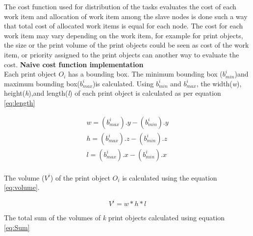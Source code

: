 The cost function used for distribution of the tasks evaluates the cost of each work item and allocation of work item among the slave nodes is done such a way that total cost of allocated work items is equal for each node. The cost for each work item may vary depending on the work item, for example for print objects, the size or the print volume of the print objects could be seen as cost of the work item, or priority assigned to the print objects can another way to evaluate the cost. 
\newline
\textbf{Naive cost function implementation }\\
Each print object \begin{math}O_{i}\end{math} has a bounding box. The minimum bounding box (\begin{math}b_{min}^i\end{math})and maximum bounding box(\begin{math}b_{max}^i\end{math})is calculated. Using \begin{math}b_{min}^i\end{math} and \begin{math}b_{max}^i\end{math}, the width(\textit{w}), height(\textit{h}),and length(\textit{l}) of each print object is calculated as per equation \ref{eq:length}

\begin{equation}
\label{eq:length}
\begin{aligned}
w=(b_{max}^i).y-(b_{min}^i).y \\
h=(b_{max}^i).z-(b_{min}^i).z \\
l=(b_{max}^i).x-(b_{min}^i).x \\
\end{aligned}
\end{equation}

The volume (\begin{math}V^i\end{math}) of the print object \begin{math}O_{i}\end{math} is calculated using the equation \ref{eq:volume}.

\begin{equation}
\label{eq:volume}
V^i= w*h*l
\end{equation}

The total sum of the volumes of \textit{k} print objects calculated using equation \ref{eq:Sum} 

